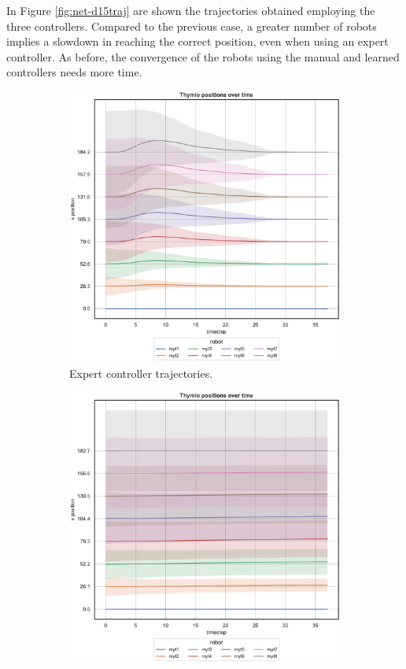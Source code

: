 In Figure \ref{fig:net-d15traj} are shown the trajectories obtained employing 
the three controllers. 
Compared to the previous case, a greater number of robots implies a 
slowdown in reaching the correct position, even when using an expert 
controller.
As before, the convergence of the robots using the manual and learned 
controllers needs more time.
\begin{figure}[H]
	\begin{center}
		\begin{subfigure}[h]{0.49\textwidth}
			\centering
			\includegraphics[width=.9\textwidth]{contents/images/net-d15/position-overtime-omniscient}%
			\caption{Expert controller trajectories.}
		\end{subfigure}
		\hfill
		\begin{subfigure}[h]{0.49\textwidth}
			\centering
			\includegraphics[width=.9\textwidth]{contents/images/net-d15/position-overtime-learned_distributed}

\end{subfigure}
\end{center}
\end{figure}
